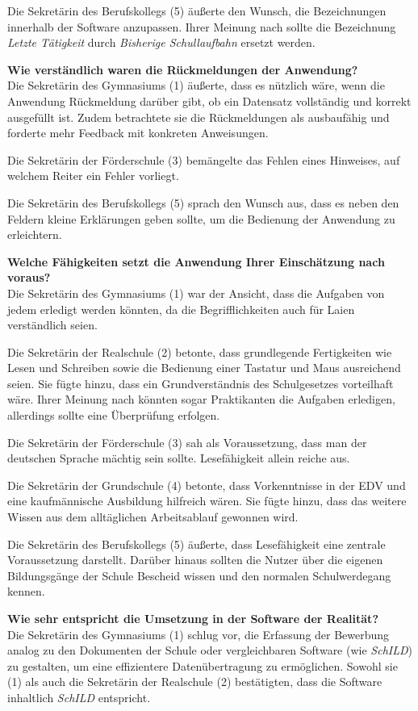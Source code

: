Die Sekretärin des Berufskollegs (5) äußerte den Wunsch, die Bezeichnungen innerhalb der Software anzupassen. Ihrer Meinung nach sollte die Bezeichnung \textit{Letzte Tätigkeit}  durch \textit{Bisherige Schullaufbahn}  ersetzt werden.

\textbf{Wie verständlich waren die Rückmeldungen der Anwendung?}\\
Die Sekretärin des Gymnasiums (1) äußerte, dass es nützlich wäre, wenn die Anwendung Rückmeldung darüber gibt, ob ein Datensatz vollständig und korrekt ausgefüllt ist. Zudem betrachtete sie die Rückmeldungen als \glqq ausbaufähig\grqq{}  und forderte mehr Feedback mit konkreten Anweisungen.

Die Sekretärin der Förderschule (3) bemängelte das Fehlen eines Hinweises, auf welchem Reiter ein Fehler vorliegt.

Die Sekretärin des Berufskollegs (5) sprach den Wunsch aus, dass es neben den Feldern kleine Erklärungen geben sollte, um die Bedienung der Anwendung zu erleichtern.

\textbf{Welche Fähigkeiten setzt die Anwendung Ihrer Einschätzung nach voraus?}\\
Die Sekretärin des Gymnasiums (1) war der Ansicht, dass die Aufgaben von jedem erledigt werden könnten, da die Begrifflichkeiten auch für Laien verständlich seien.

Die Sekretärin der Realschule (2) betonte, dass grundlegende Fertigkeiten wie Lesen und Schreiben sowie die Bedienung einer Tastatur und Maus ausreichend seien. Sie fügte hinzu, dass ein Grundverständnis des Schulgesetzes vorteilhaft wäre. Ihrer Meinung nach könnten sogar Praktikanten die Aufgaben erledigen, allerdings sollte eine Überprüfung erfolgen.

Die Sekretärin der Förderschule (3) sah als Voraussetzung, dass man der deutschen Sprache mächtig sein sollte. Lesefähigkeit allein reiche aus.

Die Sekretärin der Grundschule (4) betonte, dass Vorkenntnisse in der EDV und eine kaufmännische Ausbildung hilfreich wären. Sie fügte hinzu, dass das weitere Wissen aus dem alltäglichen Arbeitsablauf gewonnen wird.

Die Sekretärin des Berufskollegs (5) äußerte, dass Lesefähigkeit eine zentrale Voraussetzung darstellt. Darüber hinaus sollten die Nutzer über die eigenen Bildungsgänge der Schule Bescheid wissen und den normalen Schulwerdegang kennen.

\textbf{Wie sehr entspricht die Umsetzung in der Software der Realität?}\\
Die Sekretärin des Gymnasiums (1) schlug vor, die Erfassung der Bewerbung analog zu den Dokumenten der Schule oder vergleichbaren Software (wie \textit{SchILD}) zu gestalten, um eine effizientere Datenübertragung zu ermöglichen. Sowohl sie (1) als auch die Sekretärin der Realschule (2) bestätigten, dass die Software inhaltlich \textit{SchILD}  entspricht.

